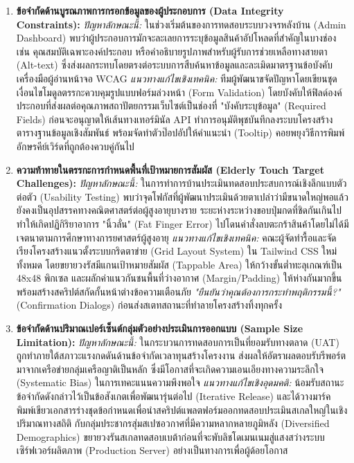 \begin{enumerate}
  \item \textbf{ข้อจำกัดด้านบูรณภาพการกรอกข้อมูลของผู้ประกอบการ (Data Integrity Constraints):}  
  \textit{ปัญหาลักษณะนี้:} ในช่วงเริ่มต้นของการทดสอบระบบวงจรหลังบ้าน (Admin Dashboard) พบว่าผู้ประกอบการมักจะละเลยการระบุข้อมูลสินค้าอัปโหลดที่สำคัญในบางช่อง เช่น คุณสมบัติเฉพาะองค์ประกอบ หรือคำอธิบายรูปภาพสำหรับผู้รับการช่วยเหลือทางสายตา (Alt-text) ซึ่งส่งผลกระทบโดยตรงต่อระบบการสืบค้นหาข้อมูลและละเมิดมาตรฐานข้อบังคับเครื่องมือผู้อ่านหน้าจอ WCAG \cite{wcag22_2023}  
  \textit{แนวทางแก้ไขเชิงเทคนิค:} ทีมผู้พัฒนาขจัดปัญหาโดยเขียนชุดเงื่อนไขโมดูลตรรกะควบคุมรูปแบบฟอร์มล่วงหน้า (Form Validation) โดยบังคับให้ฟิลด์องค์ประกอบที่ส่งผลต่อคุณภาพสถาปัตยกรรมเว็บไซต์เป็นช่องที่ "บังคับระบุข้อมูล" (Required Fields) ก่อนจะอนุญาตให้เส้นทางเทอร์มินัล API ทำการอนุมัติพุชบันทึกลงระบบโครงสร้างตารางฐานข้อมูลเชิงสัมพันธ์ พร้อมจัดทำตัวป๊อปอัปให้คำแนะนำ (Tooltip) คอยพยุงวิธีการพิมพ์อักษรคีย์เวิร์ดที่ถูกต้องควบคู่กันไป

  \item \textbf{ความท้าทายในตรรกะการกำหนดพื้นที่เป้าหมายการสัมผัส (Elderly Touch Target Challenges):}  
  \textit{ปัญหาลักษณะนี้:} ในการทำการบ้านประเมินทดสอบประสบการณ์เชิงลึกแบบตัวต่อตัว (Usability Testing) \cite{nielsen2000} พบว่าจุดโฟกัสที่ผู้พัฒนาประเมินด้วยตาเปล่าว่ามีขนาดใหญ่พอแล้ว ยังคงเป็นอุปสรรคทางคณิตศาสตร์ต่อผู้สูงอายุบางราย ระยะห่างระหว่างขอบปุ่มกดที่ชิดกันเกินไปทำให้เกิดปฏิกิริยาอาการ "นิ้วลั่น" (Fat Finger Error) ไปโดนคำสั่งลบตะกร้าสินค้าโดยไม่ได้มีเจตนาตามการศึกษาทางการยศาสตร์ผู้สูงอายุ \cite{accessibility_elderly_2012}
  \textit{แนวทางแก้ไขเชิงเทคนิค:} คณะผู้จัดทำรื้อและจัดเรียงโครงสร้างแนวตั้งระบบกริดตาข่าย (Grid Layout System) ใน Tailwind CSS ใหม่ทั้งหมด \cite{tailwind2023} โดยขยายวงรัสมีแกนเป้าหมายสัมผัส (Tappable Area) ให้กว้างขั้นต่ำทะลุเกณฑ์เป็น 48x48 พิกเซล \cite{mobileux2021} และผลักค่าแนวกันชนพื้นที่ว่างอากาศ (Margin/Padding) ให้ห่างกันมากขึ้น พร้อมสร้างสคริปต์สกัดกั้นหน้าต่างข้อความเตือนภัย \textit{"ยืนยันว่าคุณต้องการกระทำพฤติกรรมนี้?"} (Confirmation Dialogs) ก่อนส่งสเตทสถานะที่ทำลายโครงสร้างทิ้งทุกครั้ง

  \item \textbf{ข้อจำกัดด้านปริมาณเปอร์เซ็นต์กลุ่มตัวอย่างประเมินการออกแบบ (Sample Size Limitation):}  
  \textit{ปัญหาลักษณะนี้:} ในกระบวนการทดสอบการเป็นที่ยอมรับทางตลาด (UAT) ถูกทำภายใต้สภาวะแรงกดดันด้านข้อจำกัดเวลาทุนสร้างโครงงาน ส่งผลให้อัตราผลตอบรับรีพอร์ตมาจากเครือข่ายกลุ่มเครือญาติเป็นหลัก ซึ่งมีโอกาสที่จะเกิดความเอนเอียงทางความระลึกใจ (Systematic Bias) ในการเทคะแนนความพึงพอใจ 
  \textit{แนวทางแก้ไขเชิงอุดมคติ:} น้อมรับสถานะข้อจำกัดดังกล่าวไว้เป็นข้อสังเกตเพื่อพัฒนารุ่นต่อไป (Iterative Release) และได้วางมาร์คพิมพ์เขียวเอกสารร่างชุดข้อกำหนดเพื่อนำสคริปต์แพลตฟอร์มออกทดสอบประเมินสเกลใหญ่ในเชิงปริมาณทางสถิติ กับกลุ่มประชากรสุ่มสเปซอวกาศที่มีความหลากหลายภูมิหลัง (Diversified Demographics) ขยายวงรันสเกลทดสอบเบต้าก่อนที่จะพับลิชโดเมนเนมสู่แสงสว่างระบบเซิร์ฟเวอร์ผลิตภาพ (Production Server) อย่างเป็นทางการเพื่อผู้ด้อยโอกาส
\end{enumerate}

